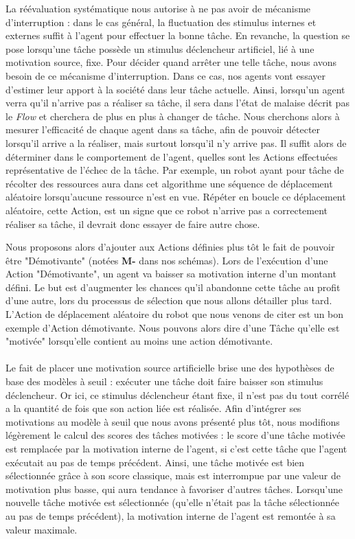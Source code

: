 			La réévaluation systématique nous autorise à ne pas avoir de mécanisme d'interruption : dans le cas général, la fluctuation des stimulus internes et externes suffit à l'agent pour effectuer la bonne tâche. En revanche, la question se pose lorsqu'une tâche possède un stimulus déclencheur artificiel, lié à une motivation source, fixe. Pour décider quand arrêter une telle tâche, nous avons besoin de ce mécanisme d'interruption. Dans ce cas, nos agents vont essayer d'estimer leur apport à la société dans leur tâche actuelle. Ainsi, lorsqu'un agent verra qu'il n'arrive pas a réaliser sa tâche, il sera dans l'état de malaise décrit pas le \textit{Flow} et cherchera de plus en plus à changer de tâche. Nous cherchons alors à mesurer l'efficacité de chaque agent dans sa tâche, afin de pouvoir détecter lorsqu'il arrive a la réaliser, mais surtout lorsqu'il n'y arrive pas. Il suffit alors de déterminer dans le comportement de l'agent, quelles sont les Actions effectuées représentative de l'échec de la tâche. Par exemple, un robot ayant pour tâche de récolter des ressources aura dans cet algorithme une séquence de déplacement aléatoire lorsqu'aucune ressource n'est en vue. Répéter en boucle ce déplacement aléatoire, cette Action, est un signe que ce robot n'arrive pas a correctement réaliser sa tâche, il devrait donc essayer de faire autre chose.
			
			Nous proposons alors d'ajouter aux Actions définies plus tôt le fait de pouvoir être "Démotivante" (notées \textbf{M-} dans nos schémas). Lors de l'exécution d'une Action "Démotivante", un agent va baisser sa motivation interne d'un montant défini. Le but est d'augmenter les chances qu'il abandonne cette tâche au profit d'une autre, lors du processus de sélection que nous allons détailler plus tard. L'Action de déplacement aléatoire du robot que nous venons de citer est un bon exemple d'Action démotivante. Nous pouvons alors dire d'une Tâche qu'elle est "motivée" lorsqu'elle contient au moins une action démotivante.
			
			\paragraph{}
			Le fait de placer une motivation source artificielle brise une des hypothèses de base des modèles à seuil : exécuter une tâche doit faire baisser son stimulus déclencheur. Or ici, ce stimulus déclencheur étant fixe, il n'est pas du tout corrélé a la quantité de fois que son action liée est réalisée. Afin d'intégrer ses motivations au modèle à seuil que nous avons présenté plus tôt, nous modifions légèrement le calcul des scores des tâches motivées : le score d'une tâche motivée est remplacée par la motivation interne de l'agent, si c'est cette tâche que l'agent exécutait au pas de temps précédent. Ainsi, une tâche motivée est bien sélectionnée grâce à son score classique, mais est interrompue par une valeur de motivation plus basse, qui aura tendance à favoriser d'autres tâches. Lorsqu'une nouvelle tâche motivée est sélectionnée (qu'elle n'était pas la tâche sélectionnée au pas de temps précédent), la motivation interne de l'agent est remontée à sa valeur maximale.
	
